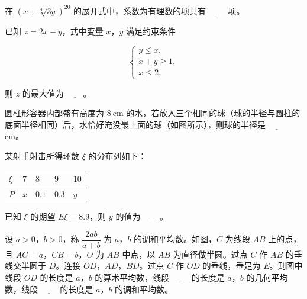 \begin{question}
在 $\left(x+\sqrt[4]{3y}\right)^{20}$ 的展开式中，系数为有理数的项共有 $\underline{\qquad}$ 项。

\end{question}
\begin{question}
已知 $z=2x-y$，式中变量 $x$，$y$ 满足约束条件

\nopagebreak[4]
\[\begin{cases}y\leqslant x,\\ x+y\geqslant1,\\ x\leqslant2,\end{cases}\]

则 $z$ 的最大值为 $\underline{\qquad}$。

\Needspace{0.4\textheight}
\end{question}
\begingroup
\renewenvironment{question}{\Needspace{0.5\textheight}}{}
\begin{question}
圆柱形容器内部盛有高度为 $8\ \mathrm{cm}$ 的水，若放入三个相同的球（球的半径与圆柱的底面半径相同）后，水恰好淹没最上面的球（如图所示），则球的半径是 $\underline{\qquad}$ cm。
\nopagebreak[4]
\begin{center}\end{center}
\nopagebreak[4]
\end{question}
\endgroup
\begin{question}
某射手射击所得环数 $\xi$ 的分布列如下：

\begin{center}
\begin{tabular}{lllll}
\toprule
$\xi$ & $7$ & $8$ & $9$ & $10$ \\
\midrule
$P$ & $x$ & $0.1$ & $0.3$ & $y$ \\
\bottomrule
\end{tabular}
\end{center}

已知 $\xi$ 的期望 $E\xi=8.9$，则 $y$ 的值为 $\underline{\qquad}$。

\Needspace{0.4\textheight}
\end{question}
\begingroup
\renewenvironment{question}{\Needspace{0.5\textheight}}{}
\begin{question}
设 $a>0$，$b>0$，称 $\dfrac{2ab}{a+b}$ 为 $a$，$b$ 的调和平均数。如图，$C$ 为线段 $AB$ 上的点，且 $AC=a$，$CB=b$，$O$ 为 $AB$ 中点，以 $AB$ 为直径做半圆。过点 $C$ 作 $AB$ 的垂线交半圆于 $D$。连接 $OD$，$AD$，$BD$。过点 $C$ 作 $OD$ 的垂线，垂足为 $E$。则图中线段 $OD$ 的长度是 $a$，$b$ 的算术平均数，线段 $\underline{\qquad}$ 的长度是 $a$，$b$ 的几何平均数，线段 $\underline{\qquad}$ 的长度是 $a$，$b$ 的调和平均数。
\nopagebreak[4]
\begin{center}\end{center}
\nopagebreak[4]
\end{question}
\endgroup
{}


